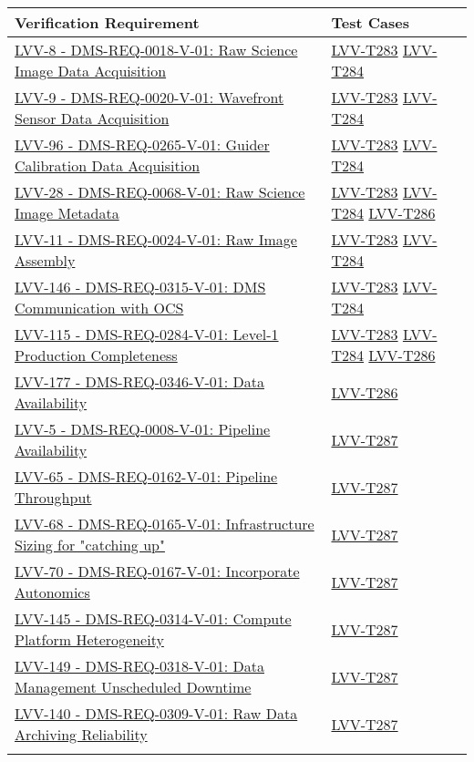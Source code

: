 \scriptsize{
\begin{longtable}[]{p{13cm}p{3cm}}
\toprule
Verification Requirement & Test Cases\tabularnewline
\midrule
\endhead

\href{https://jira.lsstcorp.org/browse/LVV-8}{LVV-8 - DMS-REQ-0018-V-01: Raw Science Image Data Acquisition}
& {
\hyperref[lvv-t283]{LVV-T283}
\hyperref[lvv-t284]{LVV-T284}
} \\
\href{https://jira.lsstcorp.org/browse/LVV-9}{LVV-9 - DMS-REQ-0020-V-01: Wavefront Sensor Data Acquisition}
& {
\hyperref[lvv-t283]{LVV-T283}
\hyperref[lvv-t284]{LVV-T284}
} \\
\href{https://jira.lsstcorp.org/browse/LVV-96}{LVV-96 - DMS-REQ-0265-V-01: Guider Calibration Data Acquisition}
& {
\hyperref[lvv-t283]{LVV-T283}
\hyperref[lvv-t284]{LVV-T284}
} \\
\href{https://jira.lsstcorp.org/browse/LVV-28}{LVV-28 - DMS-REQ-0068-V-01: Raw Science Image Metadata}
& {
\hyperref[lvv-t283]{LVV-T283}
\hyperref[lvv-t284]{LVV-T284}
\hyperref[lvv-t286]{LVV-T286}
} \\
\href{https://jira.lsstcorp.org/browse/LVV-11}{LVV-11 - DMS-REQ-0024-V-01: Raw Image Assembly}
& {
\hyperref[lvv-t283]{LVV-T283}
\hyperref[lvv-t284]{LVV-T284}
} \\
\href{https://jira.lsstcorp.org/browse/LVV-146}{LVV-146 - DMS-REQ-0315-V-01: DMS Communication with OCS}
& {
\hyperref[lvv-t283]{LVV-T283}
\hyperref[lvv-t284]{LVV-T284}
} \\
\href{https://jira.lsstcorp.org/browse/LVV-115}{LVV-115 - DMS-REQ-0284-V-01: Level-1 Production Completeness}
& {
\hyperref[lvv-t283]{LVV-T283}
\hyperref[lvv-t284]{LVV-T284}
\hyperref[lvv-t286]{LVV-T286}
} \\
\href{https://jira.lsstcorp.org/browse/LVV-177}{LVV-177 - DMS-REQ-0346-V-01: Data Availability}
& {
\hyperref[lvv-t286]{LVV-T286}
} \\
\href{https://jira.lsstcorp.org/browse/LVV-5}{LVV-5 - DMS-REQ-0008-V-01: Pipeline Availability}
& {
\hyperref[lvv-t287]{LVV-T287}
} \\
\href{https://jira.lsstcorp.org/browse/LVV-65}{LVV-65 - DMS-REQ-0162-V-01: Pipeline Throughput}
& {
\hyperref[lvv-t287]{LVV-T287}
} \\
\href{https://jira.lsstcorp.org/browse/LVV-68}{LVV-68 - DMS-REQ-0165-V-01: Infrastructure Sizing for "catching up"}
& {
\hyperref[lvv-t287]{LVV-T287}
} \\
\href{https://jira.lsstcorp.org/browse/LVV-70}{LVV-70 - DMS-REQ-0167-V-01: Incorporate Autonomics}
& {
\hyperref[lvv-t287]{LVV-T287}
} \\
\href{https://jira.lsstcorp.org/browse/LVV-145}{LVV-145 - DMS-REQ-0314-V-01: Compute Platform Heterogeneity}
& {
\hyperref[lvv-t287]{LVV-T287}
} \\
\href{https://jira.lsstcorp.org/browse/LVV-149}{LVV-149 - DMS-REQ-0318-V-01: Data Management Unscheduled Downtime}
& {
\hyperref[lvv-t287]{LVV-T287}
} \\
\href{https://jira.lsstcorp.org/browse/LVV-140}{LVV-140 - DMS-REQ-0309-V-01: Raw Data Archiving Reliability}
& {
\hyperref[lvv-t287]{LVV-T287}
} \\
\tabularnewline
\bottomrule
\end{longtable}
} %
